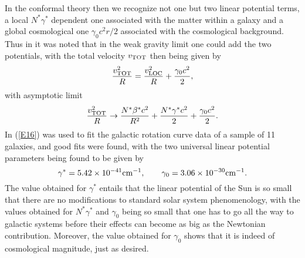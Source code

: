\documentclass[preprint,aps]{revtex4}
\begin{document}
In the conformal theory then we recognize not one but two linear potential terms, a local $N^*\gamma^*$ dependent one associated with the matter within a galaxy and a global cosmological one $\gamma_0c^2r/2$ associated with the cosmological background. Thus in \cite{Mannheim1997} it was noted that in the weak gravity limit one could add the two potentials, with the total velocity $v_{\rm TOT}$ then being given by
%                                                                               
\begin{equation}
\frac{v^2_{\rm TOT}}{R}=\frac{v^2_{\rm LOC}}{R}+\frac{\gamma_0 c^2}{2},
\label{E16}
\end{equation}                                 
%
with asymptotic limit 
% 
\begin{equation}
\frac{v_{{\rm TOT}}^2}{R} \rightarrow \frac{N^*\beta^*c^2}{R^2}+
\frac{N^*\gamma^*c^2}{2}+\frac{\gamma_0c^2}{2}.
\label{E17}
\end{equation} 
%
In \cite{Mannheim1997}  (\ref{E16}) was used to fit the galactic rotation curve data of a sample of 11 galaxies, and good fits were found, with the two universal linear potential parameters being found to be given by
%
\begin{equation}
\gamma^*=5.42\times 10^{-41} {\rm cm}^{-1},\qquad \gamma_0=3.06\times
10^{-30} {\rm cm}^{-1}.
\label{E18}
\end{equation} 
%
The value obtained for $\gamma^*$ entails that the linear potential of the Sun is so small that there are no modifications to standard solar system phenomenology, with the values obtained for $N^*\gamma^*$ and $\gamma_0$ being so small that one has to go all the way to galactic systems before their effects can become as big as the Newtonian contribution. Moreover, the value obtained for $\gamma_0$ shows that it is indeed of cosmological magnitude, just as desired.
\end{document}
